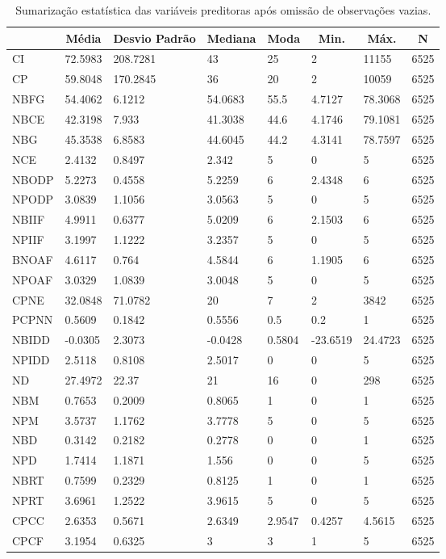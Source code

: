 \begin{table}[!htbp]
\centering
\begin{tabular}{@{}llllllll@{}}
\toprule
 & \multicolumn{1}{c}{Média} & \multicolumn{1}{c}{Desvio Padrão} & \multicolumn{1}{c}{Mediana} & \multicolumn{1}{c}{Moda} & \multicolumn{1}{c}{Min.} & \multicolumn{1}{c}{Máx.} & \multicolumn{1}{c}{N} \\ \midrule
CI & 72.5983 & 208.7281 & 43 & 25 & 2 & 11155 & 6525 \\
CP & 59.8048 & 170.2845 & 36 & 20 & 2 & 10059 & 6525 \\
NBFG & 54.4062 & 6.1212 & 54.0683 & 55.5 & 4.7127 & 78.3068 & 6525 \\
NBCE & 42.3198 & 7.933 & 41.3038 & 44.6 & 4.1746 & 79.1081 & 6525 \\
NBG & 45.3538 & 6.8583 & 44.6045 & 44.2 & 4.3141 & 78.7597 & 6525 \\
NCE & 2.4132 & 0.8497 & 2.342 & 5 & 0 & 5 & 6525 \\
NBODP & 5.2273 & 0.4558 & 5.2259 & 6 & 2.4348 & 6 & 6525 \\
NPODP & 3.0839 & 1.1056 & 3.0563 & 5 & 0 & 5 & 6525 \\
NBIIF & 4.9911 & 0.6377 & 5.0209 & 6 & 2.1503 & 6 & 6525 \\
NPIIF & 3.1997 & 1.1222 & 3.2357 & 5 & 0 & 5 & 6525 \\
BNOAF & 4.6117 & 0.764 & 4.5844 & 6 & 1.1905 & 6 & 6525 \\
NPOAF & 3.0329 & 1.0839 & 3.0048 & 5 & 0 & 5 & 6525 \\
CPNE & 32.0848 & 71.0782 & 20 & 7 & 2 & 3842 & 6525 \\
PCPNN & 0.5609 & 0.1842 & 0.5556 & 0.5 & 0.2 & 1 & 6525 \\
NBIDD & -0.0305 & 2.3073 & -0.0428 & 0.5804 & -23.6519 & 24.4723 & 6525 \\
NPIDD & 2.5118 & 0.8108 & 2.5017 & 0 & 0 & 5 & 6525 \\
ND & 27.4972 & 22.37 & 21 & 16 & 0 & 298 & 6525 \\
NBM & 0.7653 & 0.2009 & 0.8065 & 1 & 0 & 1 & 6525 \\
NPM & 3.5737 & 1.1762 & 3.7778 & 5 & 0 & 5 & 6525 \\
NBD & 0.3142 & 0.2182 & 0.2778 & 0 & 0 & 1 & 6525 \\
NPD & 1.7414 & 1.1871 & 1.556 & 0 & 0 & 5 & 6525 \\
NBRT & 0.7599 & 0.2329 & 0.8125 & 1 & 0 & 1 & 6525 \\
NPRT & 3.6961 & 1.2522 & 3.9615 & 5 & 0 & 5 & 6525 \\
CPCC & 2.6353 & 0.5671 & 2.6349 & 2.9547 & 0.4257 & 4.5615 & 6525 \\
CPCF & 3.1954 & 0.6325 & 3 & 3 & 1 & 5 & 6525 \\ \bottomrule
\end{tabular}
\caption{Sumarização estatística das variáveis preditoras após omissão de observações vazias.}
\label{tbl: sum-stats-omit}
\end{table}
